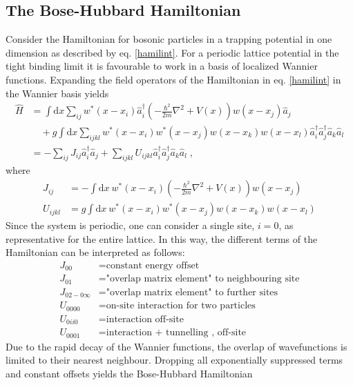 \subsection{The Bose-Hubbard Hamiltonian}
Consider the Hamiltonian for bosonic particles in a trapping potential in one dimension as described by eq. \eqref{hamilint}. For a periodic lattice potential in the tight binding limit it is favourable to work in a basis of localized Wannier functions. Expanding the field operators of the Hamiltonian in eq. \eqref{hamilint} in  the Wannier basis yields \cite{Jaksch}
\begin{align}
	\hat{H} &= \int \mathrm{d}x \sum_{i j} w^*(x-x_i) \hat{a}_{i}^{\dag} \left( - \frac{\hbar^2}{2 m} \nabla ^2 + V(x) \right) w(x-x_j) \hat{a}_j \nonumber \\
	& \quad + g \int \mathrm{d}x \sum_{i j k l} w^*(x-x_i) w^*(x-x_j) w(x-x_k) w(x-x_l) \hat{a}_{i}^{\dag} \hat{a}_{j}^{\dag} \hat{a}_{k} \hat{a}_{l} \\
	&= - \sum_{i j } J_{i j} \hat{a}_{i}^{\dag} \hat{a}_{j} + \sum_{i j k l} U_{i j k l} \hat{a}_{i}^{\dag} \hat{a}_{j}^{\dag} \hat{a}_{k} \hat{a}_{l} \; ,
\end{align}
where
\begin{align}
	J_{i j} &= - \int \mathrm{d}x \ w^*(x-x_i) \left( - \frac{\hbar^2}{2 m} \nabla ^2 + V(x) \right) w(x-x_j) \label{eq:BHparamJ} \\
	U_{i j k l} &= g \int \mathrm{d}x \ w^*(x-x_i) w^*(x-x_j) w(x-x_k) w(x-x_l) 
\end{align}
Since the system is periodic, one can consider a single site, $i = 0$, as representative for the entire lattice. In this way, the different terms of the Hamiltonian can be interpreted as follows:
\begin{align}
	J_{0 0} &= \text{constant energy offset} \nonumber \\
	J_{0 1} &= \text{"overlap matrix element" to neighbouring site} \nonumber \\
	J_{0 2 - 0 \infty} &= \text{"overlap matrix element" to further sites} \nonumber \\
	U_{0 0 0 0} &= \text{on-site interaction for two particles} \nonumber \\
	U_{0 i i 0} &= \text{interaction off-site} \nonumber \\
	U_{0 0 0 1} &= \text{interaction  + tunnelling , off-site} \nonumber 
\end{align}
Due to the rapid decay of the Wannier functions, the overlap of wavefunctions is limited to their nearest neighbour. Dropping all exponentially suppressed terms and constant offsets yields the Bose-Hubbard Hamiltonian
